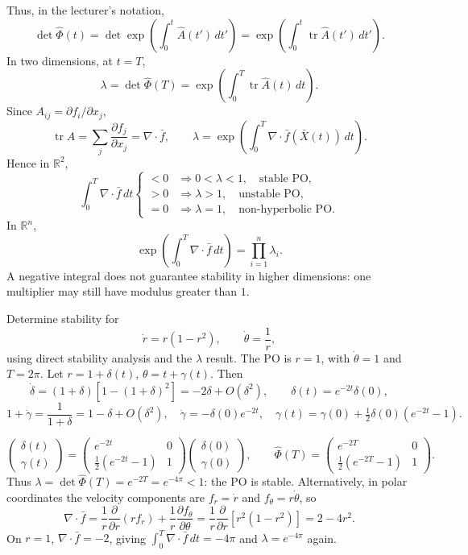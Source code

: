 \documentclass[11pt,a4paper]{article}
\begin{document}
\newpage
\noindent Thus, in the lecturer's notation,
\[
\det\widehat\Phi(t)
=\det\exp\!\left(\int_0^t\widehat A(t')\,dt'\right)
=\exp\!\left(\int_0^t\operatorname{tr}\widehat A(t')\,dt'\right).
\]
In two dimensions, at $t=T$,
\[
\lambda=\det\widehat\Phi(T)
=\exp\!\left(\int_0^T\operatorname{tr}\widehat A(t)\,dt\right).
\]
Since $A_{ij}=\partial f_i/\partial x_j$,
\[
\operatorname{tr}\widehat A=\sum_j\frac{\partial f_j}{\partial x_j}
=\nabla\cdot\bar f,
\qquad
\boxed{\lambda=\exp\!\left(\int_0^T\nabla\cdot\bar f(\bar X(t))\,dt\right)}.
\]
Hence in $\mathbb R^2$,
\[
\int_0^T\nabla\cdot\bar f\,dt
\begin{cases}
<0 &\Longrightarrow 0<\lambda<1,\quad\text{stable PO},\\
>0 &\Longrightarrow \lambda>1,\quad\text{unstable PO},\\
=0 &\Longrightarrow \lambda=1,\quad\text{non-hyperbolic PO}.
\end{cases}
\]
In $\mathbb R^n$,
\[
\exp\!\left(\int_0^T\nabla\cdot\bar f\,dt\right)=\prod_{i=1}^n\lambda_i.
\]
A negative integral does not guarantee stability in higher dimensions:
one multiplier may still have modulus greater than $1$.

\medskip
\noindent{}\quad Determine stability for
\[
\dot r=r(1-r^2),\qquad \dot\theta=\frac1r,
\]
using direct stability analysis and the $\lambda$ result.
The PO is $r=1$, with $\dot\theta=1$ and $T=2\pi$.
Let $r=1+\delta(t)$, $\theta=t+\gamma(t)$. Then
\[
\dot\delta=(1+\delta)[1-(1+\delta)^2]
=-2\delta+O(\delta^2),\qquad \delta(t)=e^{-2t}\delta(0),
\]
\[
1+\dot\gamma=\frac1{1+\delta}=1-\delta+O(\delta^2),
\quad \dot\gamma=-\delta(0)e^{-2t},
\quad \gamma(t)=\gamma(0)+\tfrac12\delta(0)(e^{-2t}-1).
\]

\newpage
\[
\begin{pmatrix}\delta(t)\\\gamma(t)\end{pmatrix}
=\begin{pmatrix}e^{-2t}&0\\\tfrac12(e^{-2t}-1)&1\end{pmatrix}
\begin{pmatrix}\delta(0)\\\gamma(0)\end{pmatrix},
\qquad
\widehat\Phi(T)=\begin{pmatrix}e^{-2T}&0\\\tfrac12(e^{-2T}-1)&1\end{pmatrix}.
\]
Thus $\lambda=\det\widehat\Phi(T)=e^{-2T}=e^{-4\pi}<1$: the PO is stable.
Alternatively, in polar coordinates the velocity components are
$f_r=\dot r$ and $f_\theta=r\dot\theta$, so
\[
\nabla\cdot\bar f
=\frac1r\frac{\partial}{\partial r}(rf_r)
+\frac1r\frac{\partial f_\theta}{\partial\theta}
=\frac1r\frac{\partial}{\partial r}[r^2(1-r^2)]=2-4r^2.
\]
On $r=1$, $\nabla\cdot\bar f=-2$, giving
$\int_0^T\nabla\cdot\bar f\,dt=-4\pi$ and $\lambda=e^{-4\pi}$ again.
\end{document}
